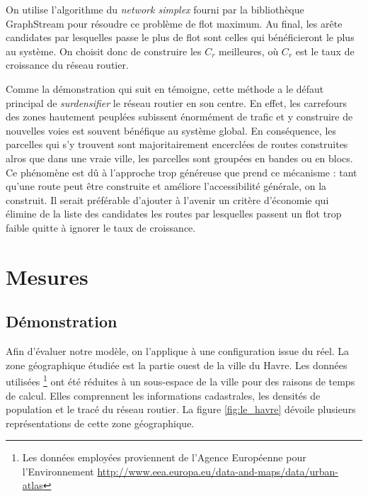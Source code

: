 \documentclass[10pt]{article}
\begin{document}
On utilise l'algorithme du \textit{network simplex} fourni par la
bibliothèque GraphStream pour résoudre ce problème de flot maximum. Au
final, les arête candidates par lesquelles passe le plus de flot sont
celles qui bénéficieront le plus au système. On choisit donc de
construire les $C_r$ meilleures, où $C_r$ est le taux de croissance du
réseau routier.

Comme la démonstration qui suit en témoigne, cette méthode a le défaut
principal de \textit{surdensifier} le réseau routier en son centre. En
effet, les carrefours des zones hautement peuplées subissent
énormément de trafic et y construire de nouvelles voies est souvent
bénéfique au système global. En conséquence, les parcelles qui s'y
trouvent sont majoritairement encerclées de routes construites alros
que dans une vraie ville, les parcelles sont groupées en bandes ou en
blocs. Ce phénomène est dû à l'approche trop généreuse que prend ce
mécanisme : tant qu'une route peut être construite et améliore
l'accessibilité générale, on la construit. Il serait préférable
d'ajouter à l'avenir un critère d'économie qui élimine de la liste des
candidates les routes par lesquelles passent un flot trop faible
quitte à ignorer le taux de croissance.

\section{Mesures}

\subsection{Démonstration}

Afin d'évaluer notre modèle, on l'applique à une configuration issue
du réel. La zone géographique étudiée est la partie ouest de la ville
du Havre. Les données utilisées \footnote{Les données employées
  proviennent de l'Agence Européenne pour l'Environnement
  \url{http://www.eea.europa.eu/data-and-maps/data/urban-atlas}} ont
été réduites à un sous-espace de la ville pour des raisons de temps de
calcul. Elles comprennent les informations cadastrales, les densités
de population et le tracé du réseau routier. La figure
\ref{fig:le_havre} dévoile plusieurs représentations de cette zone
géographique.
\end{document}
